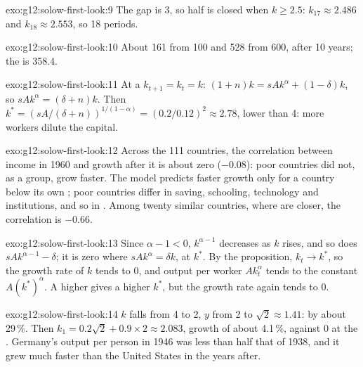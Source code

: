 \begin{solution}{exo:g12:solow-first-look:9}
The gap is 3, so half is closed when $k \ge 2.5$: $k_{17} \approx 2.486$ and $k_{18} \approx 2.553$, so 18 periods.
\end{solution}

\begin{solution}{exo:g12:solow-first-look:10}
About 161 from 100 and 528 from 600, after 10 years; the  is 358.4.
\end{solution}

\begin{solution}{exo:g12:solow-first-look:11}
At a  $k_{t+1} = k_t = k$: $(1 + n)k = sAk^{\alpha} + (1 - \delta)k$, so $sAk^{\alpha} = (\delta + n)k$. Then $k^* = (sA/(\delta + n))^{1/(1 - \alpha)} =
(0.2/0.12)^2 \approx 2.78$, lower than 4: more workers dilute the capital.
\end{solution}

\begin{solution}{exo:g12:solow-first-look:12}
Across the 111 countries, the correlation between income in 1960 and growth after it is about zero ($-0.08$): poor countries did not, as a group, grow faster. The model
predicts faster growth only for a country below its own ; poor countries differ in saving, schooling, technology and institutions, and so in .
Among twenty similar countries, where  are closer, the correlation is $-0.66$.
\end{solution}

\begin{solution}{exo:g12:solow-first-look:13}
Since $\alpha - 1 < 0$, $k^{\alpha - 1}$ decreases as $k$ rises, and so does $sAk^{\alpha - 1} - \delta$; it is zero where $sAk^{\alpha} = \delta k$, at $k^*$. By the
proposition, $k_t \to k^*$, so the growth rate of $k$ tends to 0, and output per worker $Ak_t^{\alpha}$ tends to the constant $A(k^*)^{\alpha}$. A higher  gives a
higher $k^*$, but the growth rate again tends to 0.
\end{solution}

\begin{solution}{exo:g12:solow-first-look:14}
$k$ falls from 4 to 2, $y$ from 2 to $\sqrt{2} \approx 1.41$: by about 29\,\%. Then $k_1 = 0.2\sqrt{2} + 0.9 \times 2 \approx 2.083$, growth of about 4.1\,\%, against 0 at the
. Germany's output per person in 1946 was less than half that of 1938, and it grew much faster than the United States in the years after.
\end{solution}

